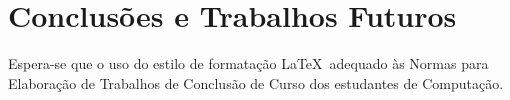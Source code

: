 \chapter{Conclusões e Trabalhos Futuros}\label{cha:conclusao}
Espera-se que o uso do estilo de formata\c{c}\~ao \LaTeX\ adequado \`as Normas para Elabora\c{c}\~ao de Trabalhos de Conclusão de Curso dos estudantes de Computação.
